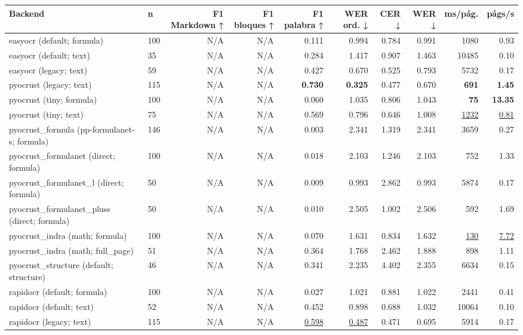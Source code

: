\documentclass[varwidth,border=2pt]{standalone}
\begin{document}
\begin{tabular}{llrrrrrrrr}
\toprule
Backend & n & F1 Markdown ↑ & F1 bloques ↑ & F1 palabra ↑ & WER ord. ↓ & CER ↓ & WER ↓ & ms/pág. & págs/s \\
\midrule
easyocr (default; formula) & 100 & N/A & N/A & 0.111 & 0.994 & 0.784 & 0.991 & 1080 & 0.93 \\
easyocr (default; text) & 35 & N/A & N/A & 0.284 & 1.417 & 0.907 & 1.463 & 10485 & 0.10 \\
easyocr (legacy; text) & 59 & N/A & N/A & 0.427 & 0.670 & 0.525 & 0.793 & 5732 & 0.17 \\
pyocrust (legacy; text) & 115 & N/A & N/A & \textbf{0.730} & \textbf{0.325} & 0.477 & 0.670 & \textbf{691} & \textbf{1.45} \\
pyocrust (tiny; formula) & 100 & N/A & N/A & 0.060 & 1.035 & 0.806 & 1.043 & \textbf{75} & \textbf{13.35} \\
pyocrust (tiny; text) & 75 & N/A & N/A & 0.569 & 0.796 & 0.646 & 1.008 & \underline{1232} & \underline{0.81} \\
pyocrust\_formula (pp-formulanet-s; formula) & 146 & N/A & N/A & 0.003 & 2.341 & 1.319 & 2.341 & 3659 & 0.27 \\
pyocrust\_formulanet (direct; formula) & 100 & N/A & N/A & 0.018 & 2.103 & 1.246 & 2.103 & 752 & 1.33 \\
pyocrust\_formulanet\_l (direct; formula) & 50 & N/A & N/A & 0.009 & 0.993 & 2.862 & 0.993 & 5874 & 0.17 \\
pyocrust\_formulanet\_pluss (direct; formula) & 50 & N/A & N/A & 0.010 & 2.505 & 1.002 & 2.506 & 592 & 1.69 \\
pyocrust\_indra (math; formula) & 100 & N/A & N/A & 0.070 & 1.631 & 0.834 & 1.632 & \underline{130} & \underline{7.72} \\
pyocrust\_indra (math; full\_page) & 51 & N/A & N/A & 0.364 & 1.768 & 2.462 & 1.888 & 898 & 1.11 \\
pyocrust\_structure (default; structure) & 46 & N/A & N/A & 0.341 & 2.235 & 4.402 & 2.355 & 6634 & 0.15 \\
rapidocr (default; formula) & 100 & N/A & N/A & 0.027 & 1.021 & 0.881 & 1.022 & 2441 & 0.41 \\
rapidocr (default; text) & 52 & N/A & N/A & 0.452 & 0.898 & 0.688 & 1.032 & 10064 & 0.10 \\
rapidocr (legacy; text) & 115 & N/A & N/A & \underline{0.598} & \underline{0.487} & 0.471 & 0.695 & 5914 & 0.17 \\
\bottomrule
\end{tabular}
\end{document}
